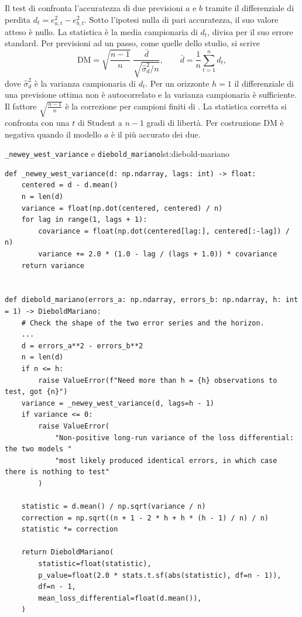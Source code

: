 Il test di \textcite{dieboldmariano1995comparing} confronta l'accuratezza di due previsioni $a$ e $b$ tramite il differenziale di perdita $d_t=e_{a,t}^2-e_{b,t}^2$. Sotto l'ipotesi nulla di pari accuratezza, il suo valore atteso è nullo. La statistica è la media campionaria di $d_t$, divisa per il suo errore standard. Per previsioni ad un passo, come quelle dello studio, si scrive
\begin{equation}
\label{eq:diebold-mariano}
\mathrm{DM}=\sqrt{\frac{n-1}{n}}\;\frac{\bar d}{\sqrt{\hat\sigma_d^2/n}},\qquad \bar d=\frac1n\sum_{t=1}^n d_t,
\end{equation}
dove $\hat\sigma_d^2$ è la varianza campionaria di $d_t$. Per un orizzonte $h=1$ il differenziale di una previsione ottima non è autocorrelato e la varianza campionaria è sufficiente. Il fattore $\sqrt{\frac{n-1}{n}}$ è la correzione per campioni finiti di \textcite{harvey1997testing}. La statistica corretta si confronta con una $t$ di Student a $n-1$ gradi di libertà. Per costruzione $\mathrm{DM}$ è negativa quando il modello $a$ è il più accurato dei due.

\begin{longlisting}{\texttt{\_newey\_west\_variance} e \texttt{diebold\_mariano}}{lst:diebold-mariano}
\begin{verbatim}
def _newey_west_variance(d: np.ndarray, lags: int) -> float:
    centered = d - d.mean()
    n = len(d)
    variance = float(np.dot(centered, centered) / n)
    for lag in range(1, lags + 1):
        covariance = float(np.dot(centered[lag:], centered[:-lag]) / n)
        variance += 2.0 * (1.0 - lag / (lags + 1.0)) * covariance
    return variance


def diebold_mariano(errors_a: np.ndarray, errors_b: np.ndarray, h: int = 1) -> DieboldMariano:
    # Check the shape of the two error series and the horizon.
    ...
    d = errors_a**2 - errors_b**2
    n = len(d)
    if n <= h:
        raise ValueError(f"Need more than h = {h} observations to test, got {n}")
    variance = _newey_west_variance(d, lags=h - 1)
    if variance <= 0:
        raise ValueError(
            "Non-positive long-run variance of the loss differential: the two models "
            "most likely produced identical errors, in which case there is nothing to test"
        )

    statistic = d.mean() / np.sqrt(variance / n)
    correction = np.sqrt((n + 1 - 2 * h + h * (h - 1) / n) / n)
    statistic *= correction

    return DieboldMariano(
        statistic=float(statistic),
        p_value=float(2.0 * stats.t.sf(abs(statistic), df=n - 1)),
        df=n - 1,
        mean_loss_differential=float(d.mean()),
    )
\end{verbatim}
\end{longlisting}

